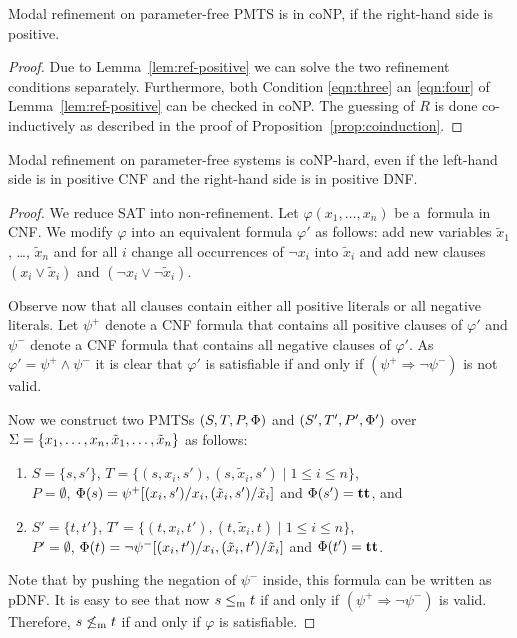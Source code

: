 \begin{proposition}
Modal refinement on parameter-free PMTS is in coNP, if the 
right-hand side is positive.
\end{proposition}
\begin{proof}
Due to Lemma~\ref{lem:ref-positive} we can solve the two refinement conditions separately.
Furthermore, both Condition \eqref{eqn:three} an \eqref{eqn:four} of Lemma~\ref{lem:ref-positive} can be checked in coNP. The guessing of $R$ is 
done co-inductively as described in the proof of 
Proposition~\ref{prop:coinduction}.

\end{proof}

\begin{proposition}
Modal refinement on parameter-free systems is coNP-hard, 
even if the left-hand side is in positive CNF
and the right-hand side is in positive DNF.
\end{proposition}
\begin{proof}
We reduce SAT into non-refinement.
Let $\varphi(x_1, \ldots, x_n)$ be a~formula in CNF.
We modify $\varphi$ into an equivalent formula $\varphi'$ as follows:
add new variables $\tilde x_1$, \ldots, $\tilde x_n$
and for all $i$ change all occurrences of $\neg x_i$ into $\tilde x_i$
and add new clauses
$(x_i \vee \tilde x_i)$ and $(\neg x_i \vee \neg \tilde x_i)$.

Observe now that all clauses contain either all positive literals 
or all negative literals. 
Let $\psi^+$ denote a CNF formula that contains all positive clauses
of $\varphi'$ and $\psi^-$ denote a CNF formula that contains all 
negative clauses of $\varphi'$.
As $\varphi' = \psi^+ \wedge \psi^-$ it is clear that 
$\varphi'$ is satisfiable if and only if
$(\psi^+ \Rightarrow \neg \psi^-)$ is not valid.

Now we construct two 
PMTSs $(S,T,P,\mathrm{\Phi})$ and $(S',T',P',\mathrm{\Phi}')$ 
over \linebreak $\mathrm{\Sigma} = \{ x_1, \ldots, x_n, \tilde x_1, \ldots, \tilde x_n \}$
 as follows: 
\begin{enumerate}
    \item  $S=\{s,s'\}$, 
    $T= \{(s,x_i,s'), (s,\tilde x_i, s') \mid 1 \leq i \leq n\}$, \\
    $P = \emptyset$,
    $\mathrm{\Phi}(s) = \psi^+[(x_i,s')/x_i,(\tilde x_i,s')/\tilde x_i]$ 
    and $\mathrm{\Phi}(s') = \mathbf{tt}$, and
    \item $S' = \{t,t'\}$, 
    $T' = \{ (t,x_i,t'),(t,\tilde x_i,t) \mid 1 \leq i \leq n\}$, \\
    $P' = \emptyset$, 
    $\mathrm{\Phi}(t) = \neg \psi^-[(x_i,t')/x_i,(\tilde x_i,t')/\tilde x_i]$ and 
$\mathrm{\Phi}(t') = \mathbf{tt}$.
\end{enumerate}
 Note that by pushing the negation of $\psi^-$ inside, 
 this formula can be written as pDNF.
It is easy to see that now $s \le_\mathrm m t$ if and only if 
$(\psi^+ \Rightarrow \neg \psi^-)$ is valid.
Therefore, $s \not\le_\mathrm m t$ if and only 
if $\varphi$ is satisfiable.

\end{proof}




